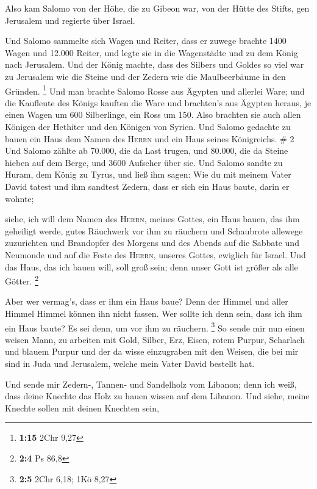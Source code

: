  Also kam Salomo von der Höhe, die zu Gibeon war, von der
Hütte des Stifts, gen Jerusalem und regierte über Israel.

 Und Salomo sammelte sich Wagen und Reiter, dass er
zuwege brachte 1400 Wagen und 12.000 Reiter, und legte sie in die
Wagenstädte und zu dem König nach Jerusalem.  Und der
König machte, dass des Silbers und Goldes so viel war zu Jerusalem wie
die Steine und der Zedern wie die Maulbeerbäume in den Gründen.
\footnote{\textbf{1:15} 2Chr 9,27}  Und man brachte
Salomo Rosse aus Ägypten und allerlei Ware; und die Kaufleute des Königs
kauften die Ware  und brachten's aus Ägypten heraus, je
einen Wagen um 600 Silberlinge, ein Ross um 150. Also brachten sie auch
allen Königen der Hethiter und den Königen von Syrien. 
Und Salomo gedachte zu bauen ein Haus dem Namen des \textsc{Herrn} und
ein Haus seines Königreichs. \# 2  Und Salomo zählte ab
70.000, die da Last trugen, und 80.000, die da Steine hieben auf dem
Berge, und 3600 Aufseher über sie.  Und Salomo sandte zu
Huram, dem König zu Tyrus, und ließ ihm sagen: Wie du mit meinem Vater
David tatest und ihm sandtest Zedern, dass er sich ein Haus baute, darin
er wohnte;

 siehe, ich will dem Namen des \textsc{Herrn}, meines
Gottes, ein Haus bauen, das ihm geheiligt werde, gutes Räuchwerk vor ihm
zu räuchern und Schaubrote allewege zuzurichten und Brandopfer des
Morgens und des Abends auf die Sabbate und Neumonde und auf die Feste
des \textsc{Herrn}, unseres Gottes, ewiglich für Israel. 
Und das Haus, das ich bauen will, soll groß sein; denn unser Gott ist
größer als alle Götter. \footnote{\textbf{2:4} Ps 86,8}

 Aber wer vermag's, dass er ihm ein Haus baue? Denn der
Himmel und aller Himmel Himmel können ihn nicht fassen. Wer sollte ich
denn sein, dass ich ihm ein Haus baute? Es sei denn, um vor ihm zu
räuchern. \footnote{\textbf{2:5} 2Chr 6,18; 1Kö 8,27}  So
sende mir nun einen weisen Mann, zu arbeiten mit Gold, Silber, Erz,
Eisen, rotem Purpur, Scharlach und blauem Purpur und der da wisse
einzugraben mit den Weisen, die bei mir sind in Juda und Jerusalem,
welche mein Vater David bestellt hat.

 Und sende mir Zedern-, Tannen- und Sandelholz vom
Libanon; denn ich weiß, dass deine Knechte das Holz zu hauen wissen auf
dem Libanon. Und siehe, meine Knechte sollen mit deinen Knechten sein,

